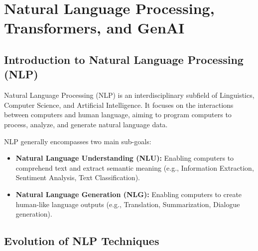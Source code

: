 \chapter*{Natural Language Processing, Transformers, and GenAI}

\section*{Introduction to Natural Language Processing (NLP)}

\begin{definition}[NLP]
Natural Language Processing (NLP) is an interdisciplinary subfield of Linguistics, Computer Science, and Artificial Intelligence. It focuses on the interactions between computers and human language, aiming to program computers to process, analyze, and generate natural language data.

NLP generally encompasses two main sub-goals:
\begin{itemize}
    \item \textbf{Natural Language Understanding (NLU):} Enabling computers to comprehend text and extract semantic meaning (e.g., Information Extraction, Sentiment Analysis, Text Classification).
    \item \textbf{Natural Language Generation (NLG):} Enabling computers to create human-like language outputs (e.g., Translation, Summarization, Dialogue generation).
\end{itemize}
\end{definition}

\section*{Evolution of NLP Techniques}

